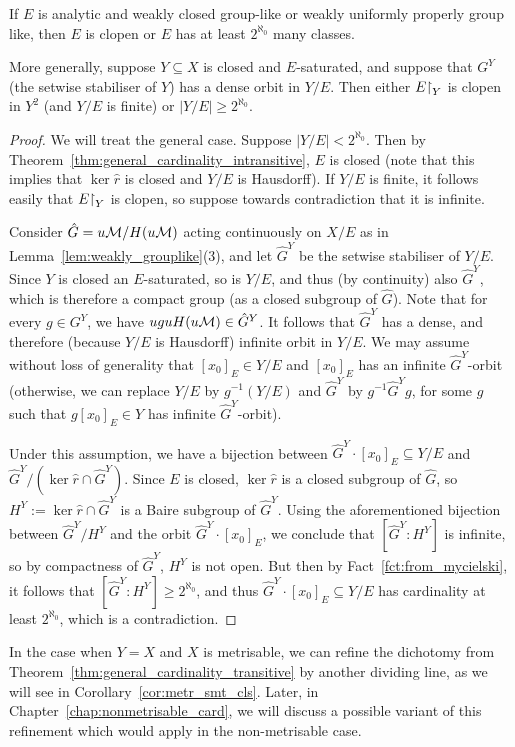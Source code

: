 	\begin{thm}
		\label{thm:general_cardinality_transitive}
		If $E$ is analytic and weakly closed group-like or weakly uniformly properly group like, then $E$ is clopen or $E$ has at least $2^{\aleph_0}$ many classes.
		
		More generally, suppose $Y\subseteq X$ is closed and $E$-saturated, and suppose that $G^Y$ (the setwise stabiliser of $Y$) has a dense orbit in $Y/E$. Then either $E\mathord{\upharpoonright}_{Y}$ is clopen in $Y^2$ (and $Y/E$ is finite) or $\lvert Y/E\rvert\geq 2^{\aleph_0}$.
	\end{thm}
	\begin{proof}
		We will treat the general case. Suppose $\lvert Y/E\rvert <2^{\aleph_0}$. Then by Theorem~\ref{thm:general_cardinality_intransitive}, $E$ is closed (note that this implies that $\ker \hat r$ is closed and $Y/E$ is Hausdorff). If $Y/E$ is finite, it follows easily that $E\mathord{\upharpoonright}_Y$ is clopen, so suppose towards contradiction that it is infinite.
		
		Consider $\hat G=u{\mathcal M}/H(u{\mathcal M})$ acting continuously on $X/E$ as in Lemma~\ref{lem:weakly_grouplike}(3), and let $\hat G^Y$ be the setwise stabiliser of $Y/E$. Since $Y$ is closed an $E$-saturated, so is $Y/E$, and thus (by continuity) also $\hat G^Y$, which is therefore a compact group (as a closed subgroup of $\hat G$). Note that for every $g\in G^Y$, we have $uguH(u{\mathcal M})\in \hat G^Y$. It follows that $\hat G^Y$ has a dense, and therefore (because $Y/E$ is Hausdorff) infinite orbit in $Y/E$. We may assume without loss of generality that $[x_0]_E\in Y/E$ and $[x_0]_E$ has an infinite $\hat G^Y$-orbit (otherwise, we can replace $Y/E$ by $g^{-1}(Y/E)$ and $\hat G^Y$ by $g^{-1}\hat G^Yg$, for some $g$ such that $g[x_0]_E\in Y$ has infinite $\hat G^Y$-orbit).
		
		Under this assumption, we have a bijection between $\hat G^Y\cdot [x_0]_E\subseteq Y/E$ and $\hat G^Y/(\ker \hat r\cap \hat G^Y)$. Since $E$ is closed, $\ker \hat r$ is a closed subgroup of $\hat G$, so $H^Y:=\ker \hat r\cap \hat G^Y$ is a Baire subgroup of $\hat G^Y$. Using the aforementioned bijection between $\hat G^Y/H^Y$ and the orbit $\hat G^Y\cdot [x_0]_E$, we conclude  that $[\hat G^Y:H^Y]$ is infinite, so by compactness of $\hat G^Y$, $H^Y$ is not open. But then by Fact~\ref{fct:from_mycielski}, it follows that $[\hat G^Y:H^Y]\geq 2^{\aleph_0}$, and thus $\hat G^Y\cdot [x_0]_E\subseteq Y/E$ has cardinality at least $2^{\aleph_0}$, which is a contradiction.
	\end{proof}
	In the case when $Y=X$ and $X$ is metrisable, we can refine the dichotomy from Theorem~\ref{thm:general_cardinality_transitive} by another dividing line, as we will see in Corollary~\ref{cor:metr_smt_cls}. Later, in Chapter~\ref{chap:nonmetrisable_card}, we will discuss a possible variant of this refinement which would apply in the non-metrisable case.
	
